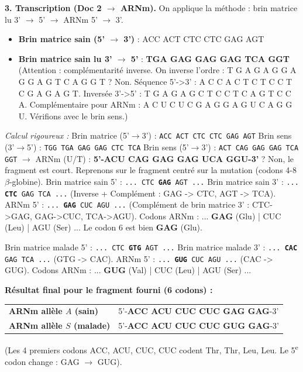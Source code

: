 \documentclass[11pt]{article}
\begin{document}
\begin{exoresolu}
\textbf{3. Transcription (Doc 2 $\rightarrow$ ARNm).}
On applique la méthode : brin matrice lu 3' $\rightarrow$ 5' $\rightarrow$ ARNm 5' $\rightarrow$ 3'.
\begin{itemize}
\item \textbf{Brin matrice sain (5' $\rightarrow$ 3')} : ACC ACT CTC CTC GAG AGT
\item \textbf{Brin matrice sain lu 3' $\rightarrow$ 5'} : \textbf{TGA GAG GAG GAG TCA GGT} (Attention : complémentarité inverse. On inverse l'ordre : T G A G A G G A G G A G T C A G G T ? Non. Séquence 5'->3' : A C C A C T C T C C T C G A G A G T. Inversée 3'->5' : T G A G A G C T C C T C A G T C C A. Complémentaire pour ARNm : A C U C U C G A G G A G U C A G G U. Vérifions avec le brin sens.)
\end{itemize}
\emph{Calcul rigoureux :}
Brin matrice (5'$\rightarrow$3') : \texttt{ACC ACT CTC CTC GAG AGT}
Brin sens (3'$\rightarrow$5') : \texttt{TGG TGA GAG GAG CTC TCA}
Brin sens (5'$\rightarrow$3') : \texttt{ACT CAG GAG GAG TCA GGT} $\rightarrow$ ARNm (U/T) : \textbf{5'-ACU CAG GAG GAG UCA GGU-3'} ? Non, le fragment est court.
Reprenons sur le fragment centré sur la mutation (codons 4-8 $\beta$-globine).
Brin matrice sain 5' : \texttt{... CTC \textbf{GAG} AGT ...}
Brin matrice sain 3' : \texttt{... \textbf{CTC} GAG TCA ...} (Inverse + Complément : GAG -> CTC, AGT -> TCA).
ARNm 5' : \texttt{... \textbf{GAG} CUC AGU ...} (Complément de brin matrice 3' : CTC->GAG, GAG->CUC, TCA->AGU).
Codons ARNm : ... \textbf{GAG} (Glu) | CUC (Leu) | AGU (Ser) ...
Le codon 6 est bien \textbf{GAG} (Glu).

Brin matrice malade 5' : \texttt{... CTC \textbf{GTG} AGT ...}
Brin matrice malade 3' : \texttt{... \textbf{CAC} GAG TCA ...} (GTG -> CAC).
ARNm 5' : \texttt{... \textbf{GUG} CUC AGU ...} (CAC -> GUG).
Codons ARNm : ... \textbf{GUG} (Val) | CUC (Leu) | AGU (Ser) ...

\textbf{Résultat final pour le fragment fourni (6 codons) :}
\begin{center}
\begin{tabular}{l l}
\textbf{ARNm allèle $A$ (sain)} & 5'-\textbf{ACC ACU CUC CUC GAG GAG}-3' \\
\textbf{ARNm allèle $S$ (malade)} & 5'-\textbf{ACC ACU CUC CUC GUG GAG}-3' \\
\end{tabular}
\end{center}
(Les 4 premiers codons ACC, ACU, CUC, CUC codent Thr, Thr, Leu, Leu. Le 5\textsuperscript{e} codon change : GAG $\rightarrow$ GUG).


\end{exoresolu}
\end{document}
